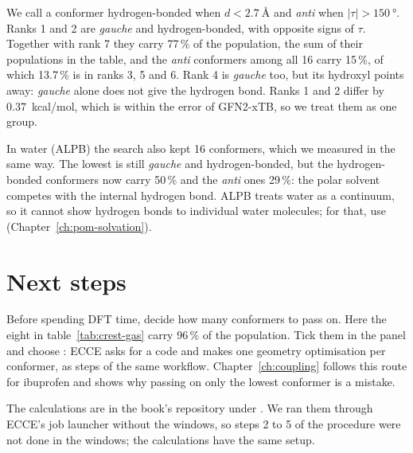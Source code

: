 We call a conformer hydrogen-bonded when $d < \SI{2.7}{\angstrom}$ and \emph{anti} when $|\tau| > \SI{150}{\degree}$. Ranks 1 and 2 are \emph{gauche} and hydrogen-bonded, with opposite signs of $\tau$. Together with rank 7 they carry 77\,\% of the population, the sum of their populations in the table, and the \emph{anti} conformers among all 16 carry 15\,\%, of which 13.7\,\% is in ranks 3, 5 and 6. Rank 4 is \emph{gauche} too, but its hydroxyl points away: \emph{gauche} alone does not give the hydrogen bond. Ranks 1 and 2 differ by 0.37~kcal/mol, which is within the error of GFN2-xTB, so we treat them as one group.

In water (ALPB) the search also kept 16 conformers, which we measured in the same way. The lowest is still \emph{gauche} and hydrogen-bonded, but the hydrogen-bonded conformers now carry 50\,\% and the \emph{anti} ones 29\,\%: the polar solvent competes with the internal hydrogen bond. ALPB treats water as a continuum, so it cannot show hydrogen bonds to individual water molecules; for that, use  (Chapter~\ref{ch:pom-solvation}).

\section{Next steps}

Before spending DFT time, decide how many conformers to pass on. Here the eight in table~\ref{tab:crest-gas} carry 96\,\% of the population. Tick them in the  panel and choose : ECCE asks for a code and makes one geometry optimisation per conformer, as steps of the same workflow. Chapter~\ref{ch:coupling} follows this route for ibuprofen and shows why passing on only the lowest conformer is a mistake.

The calculations are in the book's repository under . We ran them through ECCE's job launcher without the windows, so steps 2 to 5 of the procedure were not done in the windows; the calculations have the same setup.
